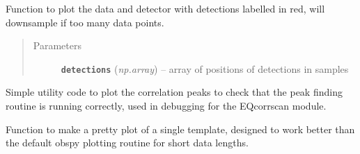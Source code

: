 \documentclass[a4paper,10pt,english]{sphinxmanual}
\begin{document}

\begin{fulllineitems}
\label{utils:EQcorrscan_plotting.detection_timeseries}
Function to plot the data and detector with detections labelled in red,
will downsample if too many data points.
\begin{quote}\begin{description}
\item[{Parameters}] \leavevmode
\textbf{\texttt{detections}} (\emph{np.array}) -- array of positions of detections in samples

\end{description}\end{quote}

\end{fulllineitems}


\begin{fulllineitems}
\label{utils:EQcorrscan_plotting.peaks_plot}
Simple utility code to plot the correlation peaks to check that the peak
finding routine is running correctly, used in debugging for the EQcorrscan
module.
\begin{quote}\begin{description}
\end{description}\end{quote}

\end{fulllineitems}


\begin{fulllineitems}
\label{utils:EQcorrscan_plotting.pretty_template_plot}
Function to make a pretty plot of a single template, designed to work better
than the default obspy plotting routine for short data lengths.
\begin{quote}\begin{description}
\end{description}\end{quote}

\end{fulllineitems}
\end{document}
